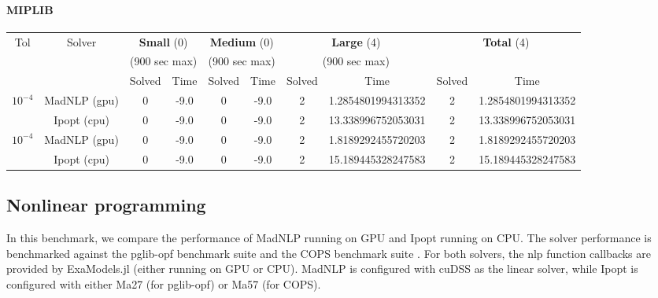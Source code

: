 \documentclass{article}
\begin{document}
\paragraph{MIPLIB}
\begin{center}
  \begin{tabular}{|c|c|cc|cc|cc|cc|}
    \hline
    \multirow{ 3}{*}{Tol} & \multirow{ 3}{*}{Solver} & \multicolumn{2}{c|}{\textbf{Small} (0)}& \multicolumn{2}{c|}{\textbf{Medium} (0)}& \multicolumn{2}{c|}{\textbf{Large} (4)}& \multicolumn{2}{c|}{\multirow{2}{*}{\textbf{Total} (4)}}\\
                          && \multicolumn{2}{c|}{(900 sec max)}& \multicolumn{2}{c|}{(900 sec max)}& \multicolumn{2}{c|}{(900 sec max)}&&\\
                          &&  Solved & Time &  Solved & Time &  Solved & Time &  Solved & Time \\
    \hline
    \multirow{2}{*}{$10^{-4}$} & MadNLP (gpu) & 0 & -9.0 & 0 & -9.0 & 2 & 1.2854801994313352 & 2 & 1.2854801994313352  \\
                          & Ipopt (cpu) & 0 & -9.0 & 0 & -9.0 & 2 & 13.338996752053031 & 2 & 13.338996752053031  \\

    \hline
    \multirow{2}{*}{$10^{-4}$} & MadNLP (gpu) & 0 & -9.0 & 0 & -9.0 & 2 & 1.8189292455720203 & 2 & 1.8189292455720203  \\
                          & Ipopt (cpu) & 0 & -9.0 & 0 & -9.0 & 2 & 15.189445328247583 & 2 & 15.189445328247583  \\

    \hline
  \end{tabular}
\end{center}

\subsection{Nonlinear programming}
In this benchmark, we compare the performance of MadNLP running on GPU and Ipopt running on CPU. The solver performance is benchmarked against the pglib-opf benchmark suite \cite{} and the COPS benchmark suite \cite{}. For both solvers, the \gls*{nlp} function callbacks are provided by ExaModels.jl (either running on GPU or CPU). MadNLP is configured with cuDSS as the linear solver, while Ipopt is configured with either Ma27 (for pglib-opf) or Ma57 (for COPS). 
\end{document}
